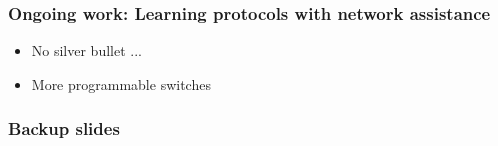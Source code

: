 \documentclass[svgnames]{beamer}
\begin{document}
\begin{Large}
\begin{frame}
\frametitle{Ongoing work: Learning protocols with network assistance}
\begin{itemize}
\item No silver bullet ...
\item More programmable switches
\end{itemize}
\end{frame}


\end{Large}

\begin{frame}[noframenumbering]
\frametitle{Backup slides}
\end{frame}


\end{document}
